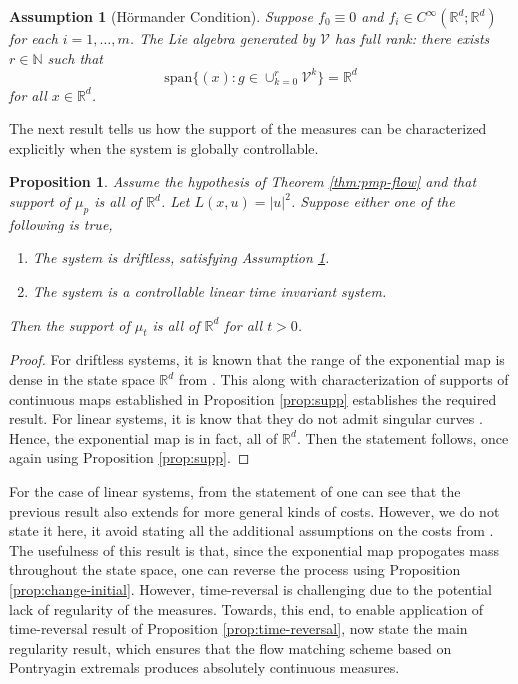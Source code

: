\documentclass{article}
\newtheorem{proposition}[theorem]{Proposition}
\newtheorem{assumption}[theorem]{Assumption}
\newcommand{\Rd}{\mathbb{R}^d}
\begin{document}
\begin{assumption}[Hörmander Condition]
\label{asmp:hormander}
Suppose $f_0 \equiv 0$ and $f_i \in C^{\infty}(\mathbb{R}^d; \mathbb{R}^d)$ for each $i = 1, \ldots, m$. The Lie algebra generated by $\mathcal{V}$ has full rank: there exists $r \in \mathbb{N}$ such that
\[\mathrm{span}\{(x) : g \in \cup_{k=0}^r \mathcal{V}^k\} = \mathbb{R}^d\]
for all $x \in \mathbb{R}^d$.
\end{assumption}
The next result tells us how the support of the measures can be characterized explicitly when the system is globally controllable.
\begin{proposition}
Assume the hypothesis of Theorem \ref{thm:pmp-flow} and that support of $\mu_p$ is all of $\Rd$.  Let $L(x,u) = |u|^2$. Suppose either one of the following is true,
\begin{enumerate}
\item The system is driftless, satisfying Assumption \ref{asmp:hormander}.
\item The system is a controllable linear time invariant system.
\end{enumerate}
Then the support of $\mu_t$ is all of $\Rd$ for all $t > 0$.
\label{prop:supppmp}
\end{proposition}
\begin{proof}
For driftless systems, it is known that the range of the exponential map is dense in the state space $\Rd$ from \cite[Theorem 1]{rifford2005morse}. This along with characterization of supports of continuous maps established in Proposition \ref{prop:supp} establishes the required result.
For linear systems, it is know that they do not admit singular curves \cite[Proposition 2.4]{cannarsa2008semiconcavity}. Hence, the exponential map is in fact, all of $\Rd$.  Then the statement follows, once again using Proposition \ref{prop:supp}.
\end{proof}

For the case of linear systems, from the statement of \cite[Proposition 2.4]{cannarsa2008semiconcavity} one can see that the previous result also extends for more general kinds of costs. However, we do not state it here, it avoid stating all the additional assumptions on the costs from \cite{cannarsa2008semiconcavity}.
The usefulness of this result is that, since the exponential map propogates mass throughout the state space, one can reverse the process using Proposition \ref{prop:change-initial}. However, time-reversal is challenging due to the potential lack of regularity of the measures.
Towards, this end, to enable application of time-reversal result of Proposition \ref{prop:time-reversal}, now state the main regularity result, which ensures that the flow matching scheme based on Pontryagin extremals produces absolutely continuous measures.
\end{document}
